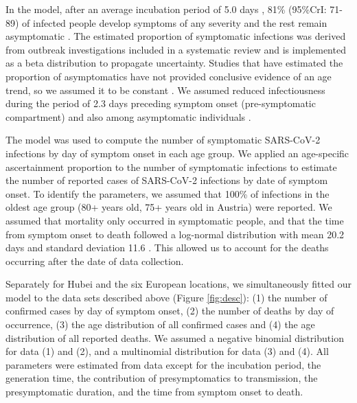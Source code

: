 \documentclass{article}
\begin{document}
In the model, after an average incubation period of 5.0 days \cite{bi2020epidemiology}, 81\% (95\%CrI: 71-89) of infected people develop symptoms of any severity and the rest remain asymptomatic \cite{buitrago2020role,updatebuitrago2020role}. 
The estimated proportion of symptomatic infections was derived from outbreak investigations included in a systematic review and is implemented as a beta distribution to propagate uncertainty.
Studies that have estimated the proportion of asymptomatics have not provided conclusive evidence of an age trend, so we assumed it to be constant \cite{JapaneseNationalInstituteofInfectiousDiseases2020}.
We assumed reduced infectiousness during the period of 2.3 days preceding symptom onset (pre-symptomatic compartment) and also among asymptomatic individuals \cite{bi2020epidemiology}.

The model was used to compute the number of symptomatic SARS-CoV-2 infections by day of symptom onset in each age group.
We applied an age-specific ascertainment proportion to the number of symptomatic infections to estimate the number of reported cases of SARS-CoV-2 infections by date of symptom onset.
To identify the parameters, we assumed that 100\% of infections in the oldest age group (80+ years old, 75+ years old in Austria) were reported.
We assumed that mortality only occurred in symptomatic people, and that the time from symptom onset to death followed a log-normal distribution with mean 20.2 days and standard deviation 11.6 \cite{linton2020incubation}.
This allowed us to account for the deaths occurring after the date of data collection. 

Separately for Hubei and the six European locations, we simultaneously fitted our model to the data sets described above (Figure \ref{fig:desc}): (1) the number of confirmed cases by day of symptom onset, (2) the number of deaths by day of occurrence, (3) the age distribution of all confirmed cases and (4) the age distribution of all reported deaths. 
We assumed a negative binomial distribution for data (1) and (2), and a multinomial distribution for data (3) and (4).
All parameters were estimated from data except for the incubation period, the generation time, the contribution of presymptomatics to transmission, the presymptomatic duration, and the time from symptom onset to death.
\end{document}
